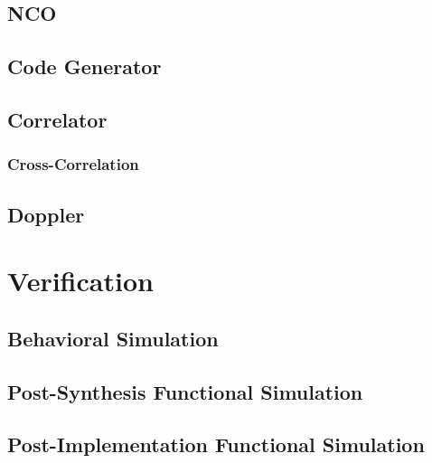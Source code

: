 \subsection{NCO}



\subsection{Code Generator}



\subsection{Correlator}
\subsubsection{Cross-Correlation}

\subsection{Doppler}

\section{Verification}
\subsection{Behavioral Simulation}
\subsection{Post-Synthesis Functional Simulation}
\subsection{Post-Implementation Functional Simulation}
